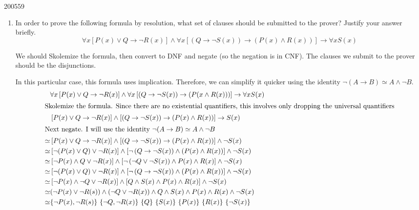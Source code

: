 \documentclass[10pt,\jkfside,a4paper]{article}
\begin{document}
\begin{examquestion}{2005}{5}{9}

\begin{enumerate}

\item In order to prove the following formula by resolution, what set of
clauses should be submitted to the prover? Justify your answer briefly.
\[
\forall x \left[ P(x) \vee Q \to \neg R(x) \right] \wedge
\forall x \left[ \left( Q \to \neg S(x) \right) \to \left( P(x) \wedge R(x)
\right) \right] \to \forall x S(x)
\]

We should Skolemize the formula, then convert to DNF and negate (so the
negation is in CNF). The clauses we submit to the prover should be the
disjunctions.

In this particular case, this formula uses implication. Therefore, we can
simplify it quicker using the identity
$\neg (A \to B) \simeq A \wedge \neg B$.
\begin{align*}
& \forall x \left[ P(x) \vee Q \to \neg R(x) \right] \wedge
\forall x \left[ \left( Q \to \neg S(x) \right) \to \left( P(x \wedge R(x))
\right) \right] \to \forall x S(x) \\
\intertext{Skolemize the formula. Since there are no existential
quantifiers, this involves only dropping the universal quantifiers}
& \left[ P(x) \vee Q \to \neg R(x) \right] \wedge
\left[ \left( Q \to \neg S(x) \right) \to \left( P(x) \wedge R(x)
\right) \right] \to S(x) \\
\intertext{Next negate. I will use the identity $\neg(A \to B) \simeq A
\wedge \neg B$}
\simeq& \left[ P(x) \vee Q \to \neg R(x) \right] \wedge
\left[ \left( Q \to \neg S(x) \right) \to \left( P(x) \wedge R(x)
\right) \right] \wedge \neg S(x) \\
\simeq& \left[ \neg (P(x) \vee Q) \vee \neg R(x) \right] \wedge
\left[ \neg\left( Q \to \neg S(x) \right) \wedge \left( P(x) \wedge R(x)
\right) \right] \wedge \neg S(x) \\
\simeq& \left[ \neg P(x) \wedge Q \vee \neg R(x) \right] \wedge
\left[ \neg\left( \neg Q \vee \neg S(x) \right) \wedge P(x) \wedge R(x)
 \right] \wedge \neg S(x) \\
\simeq& \left[ \neg (P(x) \vee Q) \vee \neg R(x) \right] \wedge
\left[ \neg\left( Q \to \neg S(x) \right) \wedge \left( P(x) \wedge R(x)
\right) \right] \wedge \neg S(x) \\
\simeq& \left[ \neg P(x) \wedge \neg Q \vee \neg R(x) \right] \wedge
\left[ Q \wedge S(x) \wedge P(x) \wedge R(x)
 \right] \wedge \neg S(x) \\
\simeq& (\neg P(x) \vee \neg R(s)) \wedge (\neg Q \vee \neg R(x)) \wedge
Q \wedge S(x) \wedge P(x) \wedge R(x) \wedge \neg S(x) \\
\simeq& \{\neg P(x), \neg R(s)\}\ \{\neg Q, \neg R(x)\}\
\{Q\}\ \{S(x)\}\ \{P(x)\}\ \{R(x)\}\ \{\neg S(x)\}
\end{align*}


\end{enumerate}
\end{examquestion}
\end{document}
